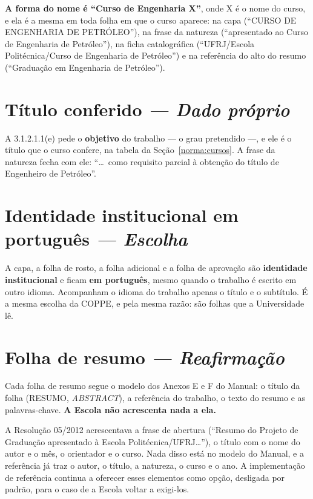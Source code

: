 \documentclass[a4paper,11pt]{article}
\newcommand\tipo[1]{\normalfont\textit{--- #1}}
\begin{document}
\textbf{A forma do nome é ``Curso de Engenharia X''}, onde X é o nome do curso,
e ela é a mesma em toda folha em que o curso aparece: na capa
(``CURSO DE ENGENHARIA DE PETRÓLEO''), na frase da natureza (``apresentado ao
Curso de Engenharia de Petróleo''), na ficha catalográfica
(``UFRJ/Escola Politécnica/Curso de Engenharia de Petróleo'') e na referência
do alto do resumo (``Graduação em Engenharia de Petróleo'').

\section{Título conferido \tipo{Dado próprio}}

A 3.1.2.1.1(e) pede o \textbf{objetivo} do trabalho --- o grau pretendido ---, e
ele é o título que o curso confere, na tabela da Seção~\ref{norma:cursos}. A
frase da natureza fecha com ele: ``\ldots\ como requisito parcial à obtenção do
título de Engenheiro de Petróleo''.

\section{Identidade institucional em português \tipo{Escolha}}

A capa, a folha de rosto, a folha adicional e a folha de aprovação são
\textbf{identidade institucional} e ficam \textbf{em português}, mesmo quando o
trabalho é escrito em outro idioma. Acompanham o idioma do trabalho apenas o
título e o subtítulo. É a mesma escolha da COPPE, e pela mesma razão: são
folhas que a Universidade lê.

\section{Folha de resumo \tipo{Reafirmação}}

Cada folha de resumo segue o modelo dos Anexos E e F do Manual: o título da
folha (RESUMO, \textit{ABSTRACT}), a referência do trabalho, o texto do resumo
e as palavras-chave. \textbf{A Escola não acrescenta nada a ela.}

A Resolução 05/2012 acrescentava a frase de abertura (``Resumo do Projeto de
Graduação apresentado à Escola Politécnica/UFRJ\ldots''), o título com o nome
do autor e o mês, o orientador e o curso. Nada disso está no modelo do Manual,
e a referência já traz o autor, o título, a natureza, o curso e o ano. A
implementação de referência continua a oferecer esses elementos como opção,
desligada por padrão, para o caso de a Escola voltar a exigi-los.
\end{document}
